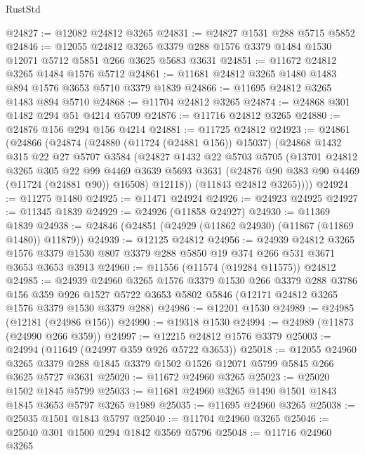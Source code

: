 \begin{lexlean}{RustStd}
\begin{coremodule}
@24827 := @12082 @24812 @3265
@24831 := @24827 @1531 @288 @5715 @5852
@24846 := @12055
    @24812
    @3265
    @3379
    @288
    @1576
    @3379
    @1484
    @1530
    @12071
    @5712
    @5851
    @266
    @3625
    @5683
    @3631
@24851 := @11672 @24812 @3265 @1484 @1576 @5712
@24861 := @11681 @24812 @3265 @1480 @1483 @894 @1576 @3653 @5710 @3379 @1839
@24866 := @11695 @24812 @3265 @1483 @894 @5710
@24868 := @11704 @24812 @3265
@24874 := @24868 @301 @1482 @294 @51 @4214 @5709
@24876 := @11716 @24812 @3265
@24880 := @24876 @156 @294 @156 @4214
@24881 := @11725 @24812
@24923 := @24861
    (@24866
      (@24874
        (@24880 (@11724 (@24881 @156)) @15037)
        (@24868
          @1432
          @315
          @22
          @27
          @5707
          @3584
          (@24827
            @1432
            @22
            @5703
            @5705
            (@13701
              @24812
              @3265
              @305
              @22
              @99
              @4469
              @3639
              @5693
              @3631
              (@24876 @90 @383 @90 @4469 (@11724 (@24881 @90)) @16508)
              @12118))
          (@11843 @24812 @3265))))
@24924 := @11275 @1480
@24925 := @11471 @24924
@24926 := @24923 @24925
@24927 := @11345 @1839
@24929 := @24926 (@11858 @24927)
@24930 := @11369 @1839
@24938 := @24846 (@24851 (@24929 (@11862 @24930) (@11867 (@11869 @1480)) @11879))
@24939 := @12125 @24812
@24956 := @24939
    @24812
    @3265
    @1576
    @3379
    @1530
    @807
    @3379
    @288
    @5850
    @19
    @374
    @266
    @531
    @3671
    @3653
    @3653
    @3913
@24960 := @11556 (@11574 (@19284 @11575)) @24812
@24985 := @24939
    @24960
    @3265
    @1576
    @3379
    @1530
    @266
    @3379
    @288
    @3786
    @156
    @359
    @926
    @1527
    @5722
    @3653
    @5802
    @5846
    (@12171 @24812 @3265 @1576 @3379 @1530 @3379 @288)
@24986 := @12201 @1530
@24989 := @24985 (@12181 (@24986 @156))
@24990 := @19318 @1530
@24994 := @24989 (@11873 (@24990 @266 @359))
@24997 := @12215 @24812 @1576 @3379
@25003 := @24994 (@11649 (@24997 @359 @926 @5722 @3653))
@25018 := @12055
    @24960
    @3265
    @3379
    @288
    @1845
    @3379
    @1502
    @1526
    @12071
    @5799
    @5845
    @266
    @3625
    @5727
    @3631
@25020 := @11672 @24960 @3265
@25023 := @25020 @1502 @1845 @5799
@25033 := @11681 @24960 @3265 @1490 @1501 @1843 @1845 @3653 @5797 @3265 @1989
@25035 := @11695 @24960 @3265
@25038 := @25035 @1501 @1843 @5797
@25040 := @11704 @24960 @3265
@25046 := @25040 @301 @1500 @294 @1842 @3569 @5796
@25048 := @11716 @24960 @3265

\end{coremodule}
\end{lexlean}
